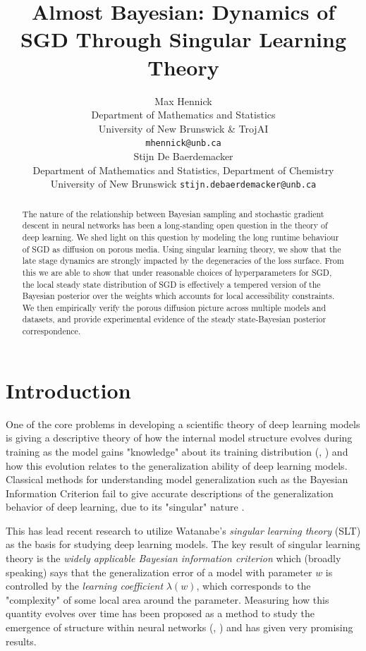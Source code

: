 \documentclass{article} %
\title{Almost Bayesian: Dynamics of SGD Through Singular Learning Theory}
\author{%
  Max Hennick \\
  Department of Mathematics and Statistics\\
  University of New Brunswick \& TrojAI\\
  \texttt{mhennick@unb.ca} \\
  \And
   Stijn De Baerdemacker \\
   Department of Mathematics and Statistics, Department of Chemistry \\
   University of New Brunswick
  \texttt{stijn.debaerdemacker@unb.ca} \\
}
\theoremstyle{definition}
\begin{document}
\maketitle

\begin{abstract}
  The nature of the relationship between Bayesian sampling and stochastic gradient descent in neural networks has been a long-standing open question in the theory of deep learning. We shed light on this question by modeling the long runtime behaviour of SGD as diffusion on porous media. Using singular learning theory, we show that the late stage dynamics are strongly impacted by the degeneracies of the loss surface. From this we are able to show that under reasonable choices of hyperparameters for SGD, the local steady state distribution of SGD is effectively a tempered version of the Bayesian posterior over the weights which accounts for local accessibility constraints. We then empirically verify the porous diffusion picture across multiple models and datasets, and provide experimental evidence of the steady state-Bayesian posterior correspondence.
\end{abstract}

\section{Introduction}
One of the core problems in developing a scientific theory of deep learning models is giving a descriptive theory of how the internal model structure evolves during training as the model gains "knowledge" about its training distribution (\citep{McGrath_2022}, \citep{olsson2022context}) and how this evolution relates to the generalization ability of deep learning models. Classical methods for understanding model generalization such as the Bayesian Information Criterion \citep{bic} fail to give accurate descriptions of the generalization behavior of deep learning, due to its "singular" nature \citep{Wei_2023}.

This has lead recent research to utilize Watanabe's \textit{singular learning theory} (SLT) \citep{Watanabe2009AlgebraicGA} as the basis for studying deep learning models. The key result of singular learning theory is the \textit{widely applicable Bayesian information criterion} \citep{watanabe2012widelyapplicablebayesianinformation} which (broadly speaking) says that the generalization error of a model with parameter $w$ is controlled by the \textit{learning coefficient} $\lambda(w)$, which corresponds to the "complexity" of some local area around the parameter. Measuring how this quantity evolves over time has been proposed as a method to study the emergence of structure within neural networks (\citep{lau2024locallearningcoefficientsingularityaware}, \citep{wang2024loss}) and has given very promising results.
\end{document}
